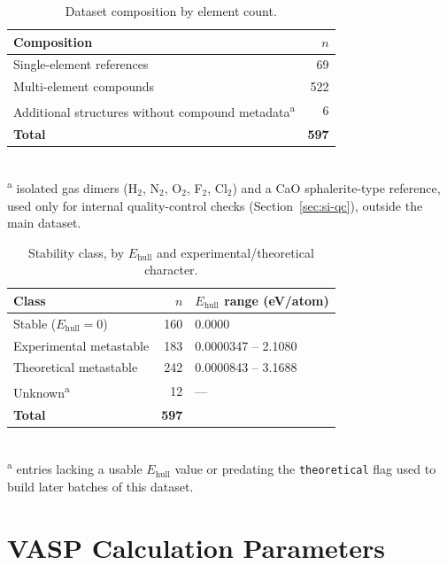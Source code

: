 \documentclass[11pt]{article}
\begin{document}
\begin{table}[htbp]
\centering
\caption{Dataset composition by element count.}
\label{tab:si-composition}
\begin{tabular}{@{}lr@{}}
\toprule
Composition & $n$ \\
\midrule
Single-element references & 69 \\
Multi-element compounds   & 522 \\
Additional structures without compound metadata\textsuperscript{a} & 6 \\
\midrule
\textbf{Total} & \textbf{597} \\
\bottomrule
\end{tabular}
\vspace{0.15cm}
\\{\footnotesize \textsuperscript{a} isolated gas dimers (H$_2$, N$_2$,
O$_2$, F$_2$, Cl$_2$) and a CaO sphalerite-type reference, used only for
internal quality-control checks (Section~\ref{sec:si-qc}), outside the main
dataset.}
\end{table}

\begin{table}[htbp]
\centering
\caption{Stability class, by $E_\text{hull}$ and experimental/theoretical
character.}
\label{tab:si-stability}
\begin{tabular}{@{}lrl@{}}
\toprule
Class & $n$ & $E_\text{hull}$ range (eV/atom) \\
\midrule
Stable ($E_\text{hull}=0$) & 160 & 0.0000 \\
Experimental metastable    & 183 & 0.0000347 -- 2.1080 \\
Theoretical metastable     & 242 & 0.0000843 -- 3.1688 \\
Unknown\textsuperscript{a} & 12 & --- \\
\midrule
\textbf{Total} & \textbf{597} & \\
\bottomrule
\end{tabular}
\vspace{0.15cm}
\\{\footnotesize \textsuperscript{a} entries lacking a usable
$E_\text{hull}$ value or predating the \texttt{theoretical} flag used to
build later batches of this dataset.}
\end{table}

\section{VASP Calculation Parameters}
\label{sec:si-incar}
\end{document}
